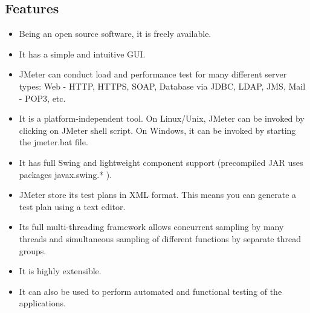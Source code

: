 \documentclass[../thesis.tex]{subfiles}
\begin{document}
\subsection{Features}
\begin{itemize}
  \item Being an open source software, it is freely available.
  \vspace{5mm}
  \item It has a simple and intuitive GUI.
  \vspace{5mm}
  \item JMeter can conduct load and performance test for many different server types: Web - HTTP, HTTPS, SOAP, Database via JDBC, LDAP, JMS, Mail - POP3, etc.
  \vspace{5mm}
  \item It is a platform-independent tool. On Linux/Unix, JMeter can be invoked by clicking on JMeter shell script. On Windows, it can be invoked by starting the jmeter.bat file.
  \vspace{5mm}
  \item It has full Swing and lightweight component support (precompiled JAR uses packages javax.swing.* ).
  \vspace{5mm}
  \item JMeter store its test plans in XML format. This means you can generate a test plan using a text editor.
  \vspace{5mm}
  \item Its full multi-threading framework allows concurrent sampling by many threads and simultaneous sampling of different functions by separate thread groups.
  \vspace{5mm}
  \item It is highly extensible.
  \vspace{5mm}
  \item It can also be used to perform automated and functional testing of the applications.
  \vspace{5mm}
\end{itemize}
\end{document}
